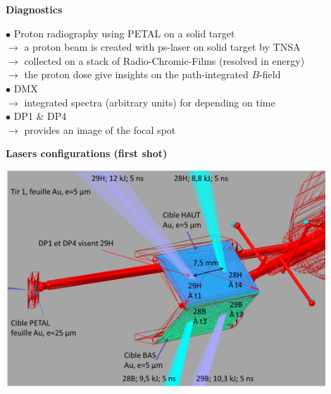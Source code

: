 \documentclass[landscape]{slides}
\begin{document}
\begin{slide}
{\large \textbf{Diagnostics}}

$\bullet$ Proton radiography using PETAL on a solid target \\
$\to$ a proton beam is created with ps-laser on solid target by TNSA \\
$\to$ collected on a stack of Radio-Chromic-Films (resolved in energy) \\
$\to$ the proton dose give insights on the path-integrated $B$-field \\

$\bullet$ DMX \\
$\to$ integrated spectra (arbitrary units) for depending on time \\

$\bullet$ DP1 \& DP4 \\
$\to$ provides an image of the focal spot \\

\end{slide}



\begin{slide}
{\large \textbf{Lasers configurations (first shot)}}

\begin{center}
\includegraphics[width=0.9\textwidth]{tir1.png}
\end{center}

\end{slide}
\end{document}
